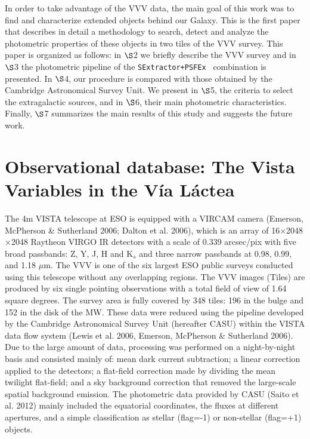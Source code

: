 \documentclass[preprint2]{aastex}
\newcommand{\dos}{{\tt SExtractor+PSFEx\ }}
\begin{document}
In order to take advantage of the
VVV data, the main goal of this work was to find and 
characterize extended objects behind our Galaxy.  
This is the first paper that describes in detail a methodology
to search, detect and analyze the photometric properties of
these objects in two tiles of the VVV survey.  
This paper is organized as follows: 
in  $\S$2 we briefly describe the VVV survey and 
in  $\S$3 the photometric pipeline of the \dos 
combination is presented.  In $\S$4, our procedure is compared with those
obtained by 
the Cambridge 
Astronomical Survey Unit.  We present in $\S$5, the criteria to
select the extragalactic sources, and in $\S$6, 
their main photometric characteristics.  
Finally, $\S$7 summarizes the main results of this study and suggests the
future work.

\section{Observational database: The Vista Variables in the V\'ia L\'actea}

The 4m VISTA telescope 
at ESO  is equipped with a VIRCAM camera (Emerson, McPherson \& 
Sutherland 2006; Dalton et al. 2006), which is an array of 
16$\times$2048$\times$2048 Raytheon VIRGO IR detectors with a scale of
0.339 arcsec/pix with five broad passbands: Z, Y, J, H and K$_s$ and three narrow 
passbands at 0.98, 0.99, and 1.18 $\mu$m.  The  VVV  is 
one of the six largest ESO public surveys conducted using this telescope without
any overlapping regions. The VVV images (Tiles) are produced by six 
single pointing observations with a 
total field of view of
1.64 square degrees. The survey area is fully covered by 348 tiles: 
196 in the bulge and 152 in the disk of the MW.
These data were reduced using the pipeline developed by the Cambridge 
Astronomical Survey Unit (hereafter CASU) within the VISTA data flow system (Lewis et al. 2006, 
Emerson, McPherson \& Sutherland 2006).
Due to the large amount of data, processing was performed on a 
night-by-night basis and consisted mainly of:  mean dark current
subtraction; a linear correction applied to the detectors; a flat-field 
correction made by dividing the mean twilight flat-field; and a sky background 
correction that removed the large-scale spatial background emission.
The photometric data provided by CASU  (Saito et al. 2012) mainly included the 
equatorial coordinates, the fluxes at different
apertures,  and a simple classification as stellar (flag=-1) or non-stellar 
(flag=+1) objects.
\end{document}
